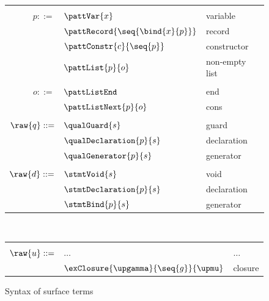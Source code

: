 \begin{figure}
{\begin{minipage}[t]{0.48\textwidth}
   \end{minipage}%
   \begin{minipage}[t]{0.5\textwidth}
      \begin{tabularx}{\textwidth}{rL{2.8cm}L{2.9cm}}
      &&
      \\
      $p ::=$
      &
      $\pattVar{x}$
      &
      variable
      \\
      &
      $\pattRecord{\seq{\bind{x}{p}}}$
      &
      record
      \\
      &
      $\pattConstr{c}{\seq{p}}$
      &
      constructor
      \\
      &
      $\pattList{p}{o}$
      &
      non-empty list
      \\[2mm]
      &&
      \\
      $o ::=$
      &
      $\pattListEnd$
      &
      end
      \\
      &
      $\pattListNext{p}{o}$
      &
      cons
      \\[2mm]
      &&
      \\
      $\raw{q} ::=$
      &
      $\qualGuard{s}$
      &
      guard
      \\
      &
      $\qualDeclaration{p}{s}$
      &
      declaration
      \\
      &
      $\qualGenerator{p}{s}$
      &
      generator
      \\[2mm]
      &&
      \\
      $\raw{d} ::=$
      &
      $\stmtVoid{s}$
      &
      void
      \\
      &
      $\stmtDeclaration{p}{s}$
      &
      declaration
      \\
      &
      $\stmtBind{p}{s}$
      &
      generator
      \end{tabularx}
   \end{minipage}\\[3mm]
   \begin{minipage}[t]{0.48\textwidth}
      \begin{tabularx}{\textwidth}{rL{2.7cm}L{3cm}}
      &&
      \\
      $\raw{u} ::=$
      &
      $\dots$
      &
      $\dots$
      \\
      &
      $\exClosure{\upgamma}{\seq{g}}{\upmu}$
      &
      closure
      \\[0mm]
      \end{tabularx}
      \end{minipage}
   }
   \caption{Syntax of surface terms}
\end{figure}
